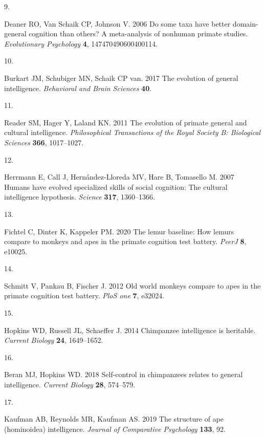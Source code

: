 \documentclass[
  man,floatsintext]{apa6}
\newlength{\cslhangindent}
\newlength{\csllabelwidth}
\newenvironment{CSLReferences}[2] %
 {\begin{list}{}{%
  \setlength{\itemindent}{0pt}
  \setlength{\leftmargin}{0pt}
  \setlength{\parsep}{0pt}
  \ifodd #1
   \setlength{\leftmargin}{\cslhangindent}
   \setlength{\itemindent}{-1\cslhangindent}
  \fi
  \setlength{\itemsep}{#2\baselineskip}}}
 {\end{list}}
\newcommand{\CSLLeftMargin}[1]{\parbox[t]{\csllabelwidth}{\strut#1\strut}}
\newcommand{\CSLRightInline}[1]{\parbox[t]{\linewidth - \csllabelwidth}{\strut#1\strut}}
\begin{document}
\begin{CSLReferences}{0}{1}
\CSLLeftMargin{9. }%
\CSLRightInline{Deaner RO, Van Schaik CP, Johnson V. 2006 Do some taxa have better domain-general cognition than others? A meta-analysis of nonhuman primate studies. \emph{Evolutionary Psychology} \textbf{4}, 147470490600400114.}

\CSLLeftMargin{10. }%
\CSLRightInline{Burkart JM, Schubiger MN, Schaik CP van. 2017 The evolution of general intelligence. \emph{Behavioral and Brain Sciences} \textbf{40}.}

\CSLLeftMargin{11. }%
\CSLRightInline{Reader SM, Hager Y, Laland KN. 2011 The evolution of primate general and cultural intelligence. \emph{Philosophical Transactions of the Royal Society B: Biological Sciences} \textbf{366}, 1017--1027.}

\CSLLeftMargin{12. }%
\CSLRightInline{Herrmann E, Call J, Hernández-Lloreda MV, Hare B, Tomasello M. 2007 Humans have evolved specialized skills of social cognition: The cultural intelligence hypothesis. \emph{Science} \textbf{317}, 1360--1366.}

\CSLLeftMargin{13. }%
\CSLRightInline{Fichtel C, Dinter K, Kappeler PM. 2020 The lemur baseline: How lemurs compare to monkeys and apes in the primate cognition test battery. \emph{PeerJ} \textbf{8}, e10025.}

\CSLLeftMargin{14. }%
\CSLRightInline{Schmitt V, Pankau B, Fischer J. 2012 Old world monkeys compare to apes in the primate cognition test battery. \emph{PloS one} \textbf{7}, e32024.}

\CSLLeftMargin{15. }%
\CSLRightInline{Hopkins WD, Russell JL, Schaeffer J. 2014 Chimpanzee intelligence is heritable. \emph{Current Biology} \textbf{24}, 1649--1652.}

\CSLLeftMargin{16. }%
\CSLRightInline{Beran MJ, Hopkins WD. 2018 Self-control in chimpanzees relates to general intelligence. \emph{Current Biology} \textbf{28}, 574--579.}

\CSLLeftMargin{17. }%
\CSLRightInline{Kaufman AB, Reynolds MR, Kaufman AS. 2019 The structure of ape (hominoidea) intelligence. \emph{Journal of Comparative Psychology} \textbf{133}, 92.}


\end{CSLReferences}
\end{document}

